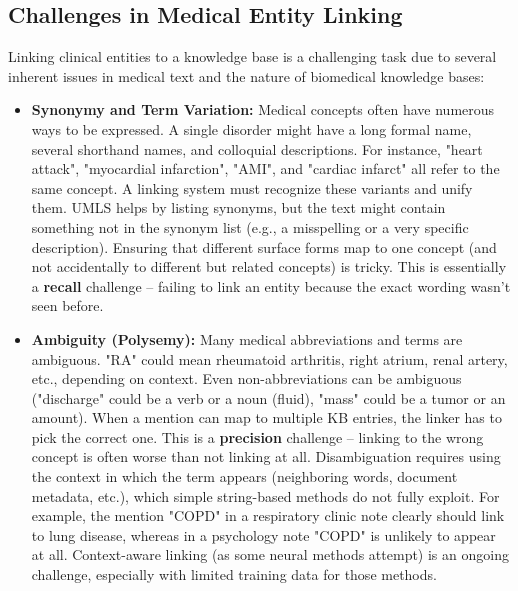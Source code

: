 \subsection{Challenges in Medical Entity Linking}

Linking clinical entities to a knowledge base is a challenging task due to several inherent issues in medical text and the nature of biomedical knowledge bases:

\begin{itemize}
\item \textbf{Synonymy and Term Variation:} Medical concepts often have numerous ways to be expressed. A single disorder might have a long formal name, several shorthand names, and colloquial descriptions. For instance, "heart attack", "myocardial infarction", "AMI", and "cardiac infarct" all refer to the same concept. A linking system must recognize these variants and unify them. UMLS helps by listing synonyms, but the text might contain something not in the synonym list (e.g., a misspelling or a very specific description). Ensuring that different surface forms map to one concept (and not accidentally to different but related concepts) is tricky. This is essentially a \textbf{recall} challenge – failing to link an entity because the exact wording wasn't seen before.

\item \textbf{Ambiguity (Polysemy):} Many medical abbreviations and terms are ambiguous. "RA" could mean rheumatoid arthritis, right atrium, renal artery, etc., depending on context. Even non-abbreviations can be ambiguous ("discharge" could be a verb or a noun (fluid), "mass" could be a tumor or an amount). When a mention can map to multiple KB entries, the linker has to pick the correct one. This is a \textbf{precision} challenge – linking to the wrong concept is often worse than not linking at all. Disambiguation requires using the context in which the term appears (neighboring words, document metadata, etc.), which simple string-based methods do not fully exploit. For example, the mention "COPD" in a respiratory clinic note clearly should link to lung disease, whereas in a psychology note "COPD" is unlikely to appear at all. Context-aware linking (as some neural methods attempt) is an ongoing challenge, especially with limited training data for those methods.


\end{itemize}
